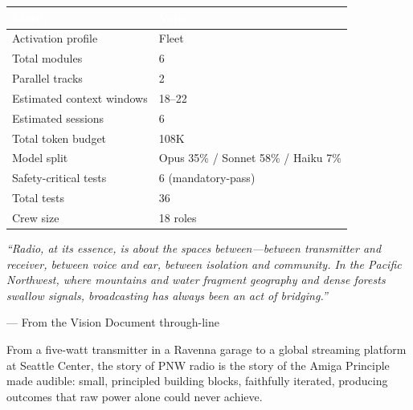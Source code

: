 \documentclass[11pt,letterpaper]{article}
\newcommand{\tableheader}[1]{\textbf{\sffamily\textcolor{white}{#1}}}
\begin{document}
\begin{center}
\begin{tabularx}{\textwidth}{L{4cm}X}
\toprule
{}
\tableheader{Metric} & \tableheader{Value} \\
\midrule
Activation profile & Fleet \\
Total modules & 6 \\
Parallel tracks & 2 \\
Estimated context windows & 18--22 \\
Estimated sessions & 6 \\
Total token budget & 108K \\
Model split & Opus 35\% / Sonnet 58\% / Haiku 7\% \\
Safety-critical tests & 6 (mandatory-pass) \\
Total tests & 36 \\
Crew size & 18 roles \\
\bottomrule
\end{tabularx}
\end{center}

\begin{quotebox}
\textit{``Radio, at its essence, is about the spaces between---between transmitter and receiver, between voice and ear, between isolation and community. In the Pacific Northwest, where mountains and water fragment geography and dense forests swallow signals, broadcasting has always been an act of bridging.''}

\vspace{0.5em}
\hfill --- From the Vision Document through-line

\vspace{0.5em}
From a five-watt transmitter in a Ravenna garage to a global streaming platform at Seattle Center, the story of PNW radio is the story of the Amiga Principle made audible: small, principled building blocks, faithfully iterated, producing outcomes that raw power alone could never achieve.
\end{quotebox}
\end{document}
